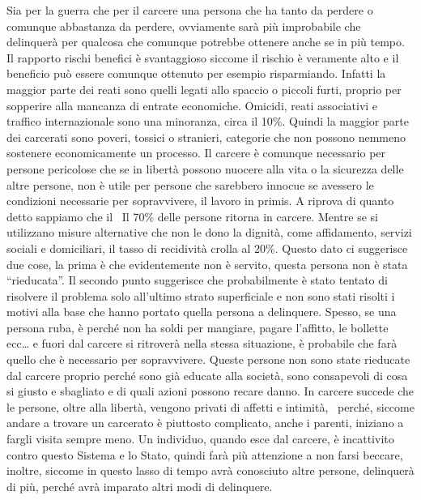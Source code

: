 \documentclass[12pt]{book} %
\begin{document}
Sia per la guerra che per il carcere una persona che ha tanto da perdere o comunque abbastanza da perdere, ovviamente
sarà più improbabile che delinquerà per qualcosa che comunque potrebbe ottenere anche se in più tempo. Il rapporto
rischi benefici è svantaggioso siccome il rischio è veramente alto e il beneficio può essere comunque ottenuto per
esempio risparmiando. Infatti la maggior parte dei reati sono quelli legati allo spaccio o piccoli furti, proprio per
sopperire alla mancanza di entrate economiche. Omicidi, reati associativi e traffico internazionale sono una minoranza,
circa il 10\%. Quindi la maggior parte dei carcerati sono poveri, tossici o stranieri, categorie che non possono
nemmeno sostenere economicamente un processo. Il carcere è comunque necessario per persone pericolose che se in libertà
possono nuocere alla vita o la sicurezza delle altre persone, non è utile per persone che sarebbero innocue se avessero
le condizioni necessarie per sopravvivere, il lavoro in primis. A riprova di quanto detto sappiamo che il \ Il 70\%
delle persone ritorna in
carcere. Mentre se
si utilizzano misure alternative che non le dono la dignità, come affidamento, servizi sociali e domiciliari, il tasso
di recidività crolla al 20\%. Questo dato ci suggerisce due cose, la prima è che evidentemente non è servito, questa
persona non è stata “rieducata”. Il secondo punto suggerisce che probabilmente è stato tentato di risolvere il problema
solo all'ultimo strato superficiale e non sono stati risolti i motivi alla base che hanno portato
quella persona a delinquere. Spesso, se una persona ruba, è perché non ha soldi per mangiare, pagare
l'affitto, le bollette ecc… e fuori dal carcere si ritroverà nella stessa situazione, è probabile
che farà quello che è necessario per sopravvivere. Queste persone non sono state rieducate dal carcere proprio perché
sono già educate alla società, sono consapevoli di cosa si giusto e sbagliato e di quali azioni possono recare danno.
In carcere succede che le persone, oltre alla libertà, vengono privati di affetti e intimità, \ perché, siccome andare
a trovare un carcerato è piuttosto complicato, anche i parenti, iniziano a fargli visita sempre meno. Un individuo,
quando esce dal carcere, è incattivito contro questo Sistema e lo Stato, quindi farà più attenzione a non farsi
beccare, inoltre, siccome in questo lasso di tempo avrà conosciuto altre persone, delinquerà di più, perché avrà
imparato altri modi di delinquere. 
\end{document}
